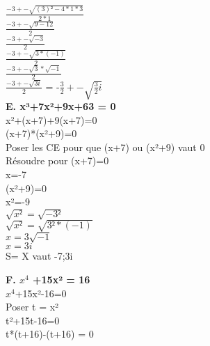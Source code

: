 $\frac{-3+-\sqrt{(3)²-4*1*3}}{2*1}$ \\

$\frac{-3+-\sqrt{9-12}}{2}$ \\

$\frac{-3+-\sqrt{-3}}{2}$ \\

$\frac{-3+-\sqrt{3 * (-1)}}{2}$ \\

$\frac{-3+-\sqrt{3} * \sqrt{-1}}{2}$ \\

$\frac{-3+-\sqrt{3i}}{2}$ = -$\frac{3}{2} +- \sqrt{\frac{3}{2}i}$ \\

\vspace{10mm} %
\textbf{E. x³+7x²+9x+63 = 0} \\

x²+(x+7)+9(x+7)=0 \\

(x+7)*(x²+9)=0 \\

Poser les CE pour que (x+7) ou (x²+9) vaut 0 \\

Résoudre pour (x+7)=0 \\

x=-7 \\

(x²+9)=0 \\

x²=-9 \\

$\sqrt{x²} =\sqrt{-3²}$ \\

$\sqrt{x²}=\sqrt{3²*(-1)}$ \\

$x=3\sqrt{-1}$ \\

$x=3i$ \\

S= X vaut -7;3i \\

\newpage

\textbf{F. $x^{4}$ +15x² = 16} \\

$x^{4}$+15x²-16=0 \\

Poser t = x² \\

t²+15t-16=0 \\

t*(t+16)-(t+16) = 0 \\

